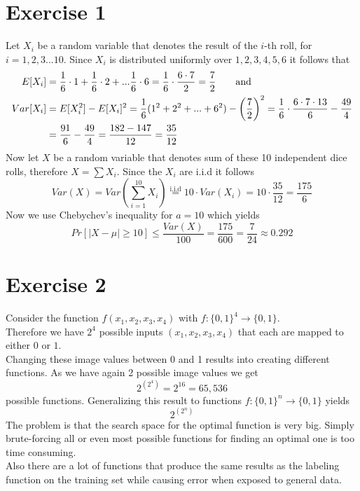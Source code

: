 \documentclass[12pt]{article}
\begin{document}
\section*{Exercise 1}

Let $X_i$ be a random variable that denotes the result of the $i$-th roll, for $i=1,2,3...10$. Since $X_i$ is distributed uniformly over $1,2,3,4,5,6$ it follows that 
\begin{align*}
	E[X_i] &= \frac{1}{6}\cdot 1 + \frac{1}{6}\cdot 2 + ... \frac{1}{6}\cdot 6 = \frac{1}{6}\cdot \frac{6 \cdot 7}{2} = \frac{7}{2} \text{\qquad and} \\
	Var[X_i] &= E[X_i^2] - E[X_i]^2 = \frac{1}{6}(1^2 + 2^2 + ... + 6^2) - \left( \frac{7}{2} \right)^2 = \frac{1}{6} \cdot \frac{6 \cdot 7 \cdot 13}{6} - \frac{49}{4} \\
	&= \frac{91}{6} - \frac{49}{4} = \frac{182 - 147}{12} = \frac{35}{12}
\end{align*}
Now let $X$ be a random variable that denotes sum of these 10 independent dice rolls, therefore $X = \sum X_i$. Since the $X_i$ are i.i.d it follows
\begin{equation*}
	Var(X) = Var \left( \sum_{i=1}^{10} X_i \right) \overset{\text{i.i.d}}{=} 10 \cdot Var(X_i) = 10 \cdot \frac{35}{12} = \frac{175}{6}
\end{equation*}
Now we use Chebychev's inequality for $a=10$ which yields
\begin{equation*}
	Pr[|X - \mu| \geq 10] \leq \frac{Var(X)}{100} = \frac{175}{600} = \frac{7}{24} \approx 0.292
\end{equation*}

\section*{Exercise 2}
Consider the function $f(x_1,x_2,x_3,x_4)$ with $f: \{0,1\}^4 \rightarrow \{0,1\}$. \\
Therefore we have $2^4$ possible inputs $(x_1,x_2,x_3,x_4)$ that each are mapped to either $0$ or $1$. \\
Changing these image values between 0 and 1 results into creating different functions. As we have again 2 possible image values we get
\begin{equation*}
	2^{\left( 2^4 \right)} = 2^{16} = 65,536
\end{equation*}
possible functions. Generalizing this result to functions  $f: \{0,1\}^n \rightarrow \{0,1\}$ yields
\begin{equation*}
	2^{\left( 2^n \right)}
\end{equation*}
The problem is that the search space for the optimal function is very big. Simply brute-forcing all or even most possible functions for finding an optimal one is too time consuming. \\Also there are a lot of functions that produce the same results as the labeling function on the training set while causing error when exposed to general data.
\end{document}
